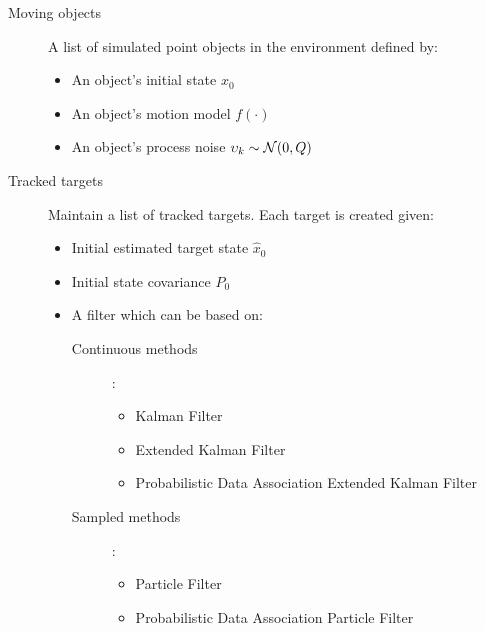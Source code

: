 \begin{description}
	\item[Moving objects] A list of simulated point objects in the environment defined by:
	\begin{itemize}
		\item An object's initial state $x_0$
		\item An object's  motion model $f(\cdot)$
		\item An object's process noise $ {\upsilon}_k \sim \mathcal{N}(0,
		{Q})$
	\end{itemize}
\end{description}

\begin{description}
	\item[Tracked targets] Maintain a list of tracked targets. Each target is created given:
	\begin{itemize}
		\item Initial estimated target state $\hat{x}_0$
		\item Initial state covariance $P_0$
		\item A filter which can be based on:
			\begin{description}
				\item[Continuous methods]:
					\begin{itemize}
						\item Kalman Filter
						\item Extended Kalman Filter
						\item Probabilistic Data Association Extended Kalman Filter
					\end{itemize}		
			\end{description}
			\begin{description}
				\item[Sampled methods]:
					\begin{itemize}
						\item Particle Filter
						\item Probabilistic Data Association Particle Filter
					\end{itemize}
			\end{description}			
	\end{itemize}
\end{description}


